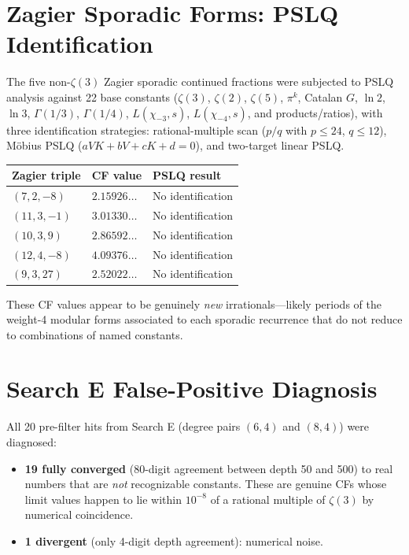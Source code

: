 \documentclass[11pt]{article}
\begin{document}
\section{Zagier Sporadic Forms: PSLQ Identification}

The five non-$\zeta(3)$ Zagier sporadic continued fractions were subjected to
PSLQ analysis against 22 base constants ($\zeta(3)$, $\zeta(2)$, $\zeta(5)$,
$\pi^k$, Catalan $G$, $\ln 2$, $\ln 3$, $\Gamma(1/3)$, $\Gamma(1/4)$,
$L(\chi_{-3},s)$, $L(\chi_{-4},s)$, and products/ratios), with three
identification strategies: rational-multiple scan ($p/q$ with $p\leq 24$,
$q\leq 12$), M\"obius PSLQ ($aVK+bV+cK+d=0$), and two-target linear PSLQ.

\begin{center}
\begin{tabular}{@{}lll@{}}
\toprule
Zagier triple & CF value & PSLQ result \\
\midrule
$(7,2,-8)$ & $2.15926\ldots$ & No identification \\
$(11,3,-1)$ & $3.01330\ldots$ & No identification \\
$(10,3,9)$ & $2.86592\ldots$ & No identification \\
$(12,4,-8)$ & $4.09376\ldots$ & No identification \\
$(9,3,27)$ & $2.52022\ldots$ & No identification \\
\bottomrule
\end{tabular}
\end{center}

These CF values appear to be genuinely \emph{new} irrationals---likely
periods of the weight-4 modular forms associated to each sporadic
recurrence that do not reduce to combinations of named constants.

\section{Search E False-Positive Diagnosis}

All 20 pre-filter hits from Search E (degree pairs $(6,4)$ and $(8,4)$) were
diagnosed:

\begin{itemize}
\item \textbf{19 fully converged} (80-digit agreement between depth 50 and 500)
to real numbers that are \emph{not} recognizable constants.  These are genuine
CFs whose limit values happen to lie within $10^{-8}$ of a rational multiple
of $\zeta(3)$ by numerical coincidence.
\item \textbf{1 divergent} (only 4-digit depth agreement): numerical noise.
\end{itemize}
\end{document}
